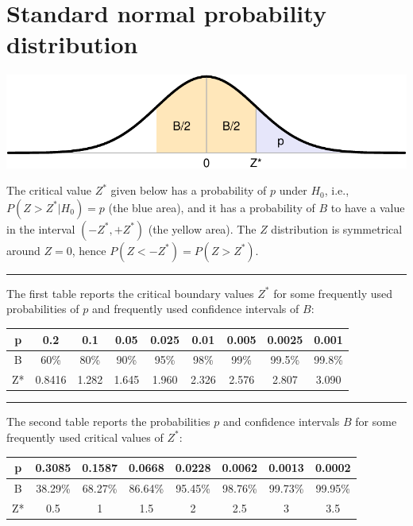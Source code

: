\documentclass[
]{book}
\begin{document}
\hypertarget{app:criticalZvalues}{%
\chapter{Standard normal probability distribution}\label{app:criticalZvalues}}

\includegraphics{QMS-EN_files/figure-latex/kritiekeZwaarden-hulpfiguur-1.pdf}

The critical value \(Z^*\) given below has a probability of \(p\) under \(H_0\), i.e.,
\(P(Z > Z^*|H_0)=p\) (the blue area),
and it has a probability of \(B\) to have a value in the interval \((-Z^*, +Z^*)\) (the yellow area).
The \(Z\) distribution is symmetrical around \(Z=0\), hence \(P(Z < -Z^*) = P(Z > Z^*)\).

\begin{center}\rule{0.5\linewidth}{0.5pt}\end{center}

The first table reports the critical boundary values \(Z^*\) for some frequently used probabilities of \(p\) and frequently used confidence intervals of \(B\):

\begin{tabular}{ccccccccc}
\toprule
p & 0.2 & 0.1 & 0.05 & 0.025 & 0.01 & 0.005 & 0.0025 & 0.001\\
\midrule
B & 60\% & 80\% & 90\% & 95\% & 98\% & 99\% & 99.5\% & 99.8\%\\
Z* & 0.8416 & 1.282 & 1.645 & 1.960 & 2.326 & 2.576 & 2.807 & 3.090\\
\bottomrule
\end{tabular}

\begin{center}\rule{0.5\linewidth}{0.5pt}\end{center}

The second table reports the probabilities \(p\) and confidence intervals \(B\) for some frequently used critical values of \(Z^*\):

\begin{tabular}{cccccccc}
\toprule
p & 0.3085 & 0.1587 & 0.0668 & 0.0228 & 0.0062 & 0.0013 & 0.0002\\
\midrule
B & 38.29\% & 68.27\% & 86.64\% & 95.45\% & 98.76\% & 99.73\% & 99.95\%\\
Z* & 0.5 & 1 & 1.5 & 2 & 2.5 & 3 & 3.5\\
\bottomrule
\end{tabular}
\end{document}
